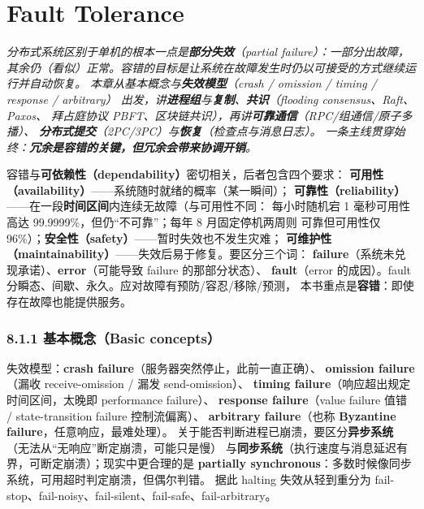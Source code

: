 \chapter{Fault Tolerance}
\begin{center}
\begin{minipage}{0.9\textwidth}
\itshape\small\color{dsgray}
分布式系统区别于单机的根本一点是\textbf{部分失效}（partial failure）：一部分出故障，
其余仍（看似）正常。容错的目标是让系统在故障发生时仍以可接受的方式继续运行并自动恢复。
本章从基本概念与\textbf{失效模型}（crash / omission / timing / response / arbitrary）
出发，讲\textbf{进程组}与\textbf{复制}、\textbf{共识}（flooding consensus、Raft、Paxos、
拜占庭协议 PBFT、区块链共识），再讲\textbf{可靠通信}（RPC/组通信/原子多播）、
\textbf{分布式提交}（2PC/3PC）与\textbf{恢复}（检查点与消息日志）。
一条主线贯穿始终：\textbf{冗余是容错的关键，但冗余会带来协调开销}。
\end{minipage}
\end{center}


容错与\textbf{可依赖性（dependability）}密切相关，后者包含四个要求：
\textbf{可用性（availability）}——系统随时就绪的概率（某一瞬间）；
\textbf{可靠性（reliability）}——在一段\textbf{时间区间}内连续无故障（与可用性不同：
每小时随机宕 1 毫秒可用性高达 99.9999\%，但仍“不可靠”；每年 8 月固定停机两周则
可靠但可用性仅 96\%）；\textbf{安全性（safety）}——暂时失效也不发生灾难；
\textbf{可维护性（maintainability）}——失效后易于修复。要区分三个词：
\textbf{failure}（系统未兑现承诺）、\textbf{error}（可能导致 failure 的那部分状态）、
\textbf{fault}（error 的成因）。fault 分瞬态、间歇、永久。应对故障有预防/容忍/移除/预测，
本书重点是\textbf{容错}：即使存在故障也能提供服务。

\subsection*{8.1.1 基本概念（Basic concepts）}
失效模型：\textbf{crash failure}（服务器突然停止，此前一直正确）、
\textbf{omission failure}（漏收 receive-omission / 漏发 send-omission）、
\textbf{timing failure}（响应超出规定时间区间，太晚即 performance failure）、
\textbf{response failure}（value failure 值错 / state-transition failure 控制流偏离）、
\textbf{arbitrary failure}（也称 \textbf{Byzantine failure}，任意响应，最难处理）。
关于能否判断进程已崩溃，要区分\textbf{异步系统}（无法从“无响应”断定崩溃，可能只是慢）
与\textbf{同步系统}（执行速度与消息延迟有界，可断定崩溃）；现实中更合理的是
\textbf{partially synchronous}：多数时候像同步系统，可用超时判定崩溃，但偶尔判错。
据此 halting 失效从轻到重分为 fail-stop、fail-noisy、fail-silent、fail-safe、fail-arbitrary。

